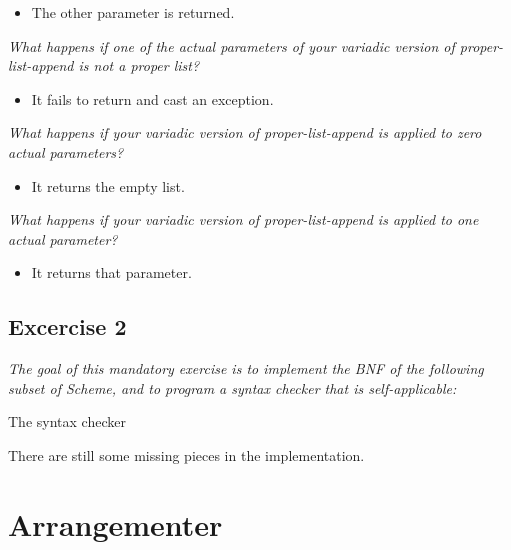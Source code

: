 \documentclass[a4paper,final,12pt,oneside,article,table]{memoir}
\begin{document}
\begin{itemize}
\item The other parameter is returned.
\end{itemize}
\textit{What happens if one of the actual parameters of your variadic version of \textit{proper-list-append} is not a proper list?}
\begin{itemize}
\item It fails to return and cast an exception.
\end{itemize}
\textit{What happens if your variadic version of \textit{proper-list-append} is applied to zero actual parameters?}
\begin{itemize}
\item It returns the empty list.
\end{itemize}
\textit{What happens if your variadic version of \textit{proper-list-append} is applied to one actual parameter?} 
\begin{itemize}
\item It returns that parameter.
\end{itemize}

\section*{Excercise 2}
\textit{The goal of this mandatory exercise is to implement the BNF of the following subset of Scheme, and to program a syntax checker that is self-applicable:}

The syntax checker

There are still some missing pieces in the implementation.

\chapter{Arrangementer}
\end{document}
